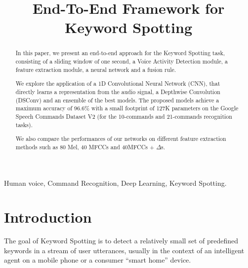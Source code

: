 \documentclass[conference]{IEEEtran}
\begin{document}
\title{End-To-End Framework for Keyword Spotting}
\author{
\and
{}
}

\maketitle

\begin{abstract}
In this paper, we present an end-to-end approach for the Keyword Spotting task, consisting of a sliding window of one second, a Voice Activity Detection module, a feature extraction module, a neural network and a fusion rule.

We explore the application of a 1D Convolutional Neural Network (CNN), that directly learns a representation from the audio signal, a Depthwise Convolution (DSConv) and an ensemble of the best models.
The proposed models achieve a maximum accuracy of 96.6\% with a small footprint of 127K parameters on the Google Speech Commands Dataset V2 (for the 10-commands and 21-commands recognition tasks).

We also compare the performances of our networks on different feature extraction methods such as 80 Mel, 40 MFCCs and 40MFCCs + $\Delta$s.
\end{abstract}

\IEEEpeerreviewmaketitle
\begin{IEEEkeywords}
Human voice, Command Recognition, Deep Learning, Keyword Spotting.
\end{IEEEkeywords}

\section{Introduction}
The goal of Keyword Spotting is to detect a relatively small set of predefined keywords in a stream of user utterances, usually in the context of an intelligent agent on a mobile phone or a consumer “smart home” device.
\end{document}
